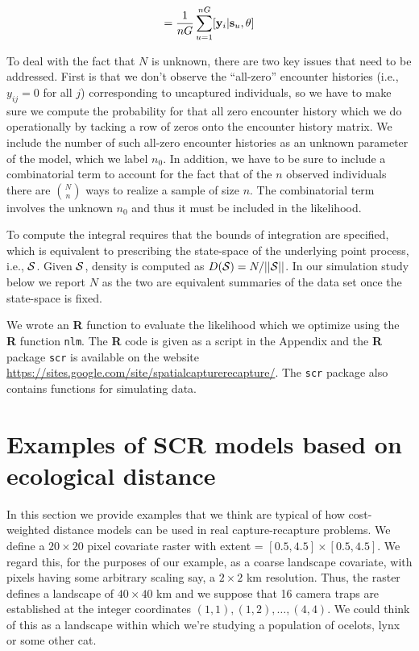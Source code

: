 \documentclass[12pt]{article}
\begin{document}
\begin{spacing}{1.8}
\begin{equation}
         [{\bf y}_{i}|\theta] = \frac{1}{nG} \sum_{u=1}^{nG}  [ {\bf
            y}_{i} |{\bf s}_u, \theta]
\label{mle.eq.intlik}
\end{equation}

To deal with the fact that $N$ is unknown, there are two key issues
that need to be addressed.  First is that we don't observe the
``all-zero'' encounter histories (i.e., $y_{ij} = 0$ for all $j$)
corresponding to uncaptured individuals, so we have to make sure we
compute the probability for that all zero encounter history which we
do operationally by tacking a row of zeros onto the encounter history
matrix. We include the number of such all-zero encounter histories as
an unknown parameter of the model, which we label $n_{0}$.  In
addition, we have to be sure to include a combinatorial term to
account for the fact that of the $n$ observed individuals there are
${N \choose n}$ ways to realize a sample of size $n$. The
combinatorial term involves the unknown $n_{0}$ and thus it must be
included in the likelihood.

To compute the integral requires that the bounds of integration are
specified, which is equivalent to prescribing the state-space of the
underlying point process, i.e., ${\cal S}$. Given ${\cal S}$, density
is 
computed as $D({\cal S}) = N/||{\cal S}||$. In our simulation study
below we report $N$ as the two are equivalent summaries of the data
set once the state-space is fixed.

We wrote an {\bf R} function to evaluate the likelihood which we optimize
using the {\bf R} function \mbox{\tt nlm}.
The {\bf R} code is given as a script in the Appendix and the {\bf R}
package \mbox{\tt scr}
is available on the website
\url{https://sites.google.com/site/spatialcapturerecapture/}. The
\mbox{\tt scr} package also contains
functions for simulating data.


\section{Examples of SCR models based on ecological distance}

In this section we provide examples that we think are typical of how
cost-weighted distance models can be used in real capture-recapture
problems.  We define a $20 \times 20$ pixel covariate raster with
extent = $[0.5, 4.5] \times [0.5, 4.5]$.  We regard this, for the
purposes of our example, as a coarse landscape covariate, with pixels
having some arbitrary scaling say, a $2 \times 2$ km resolution. Thus,
the raster defines a landscape of $40 \times 40$ km and we suppose
that 16 camera traps are established at the integer coordinates
$(1,1), (1,2), \ldots, (4,4)$. We could think of this as a landscape
within which we're studying a population of ocelots, lynx or some
other cat.


\end{spacing}
\end{document}
